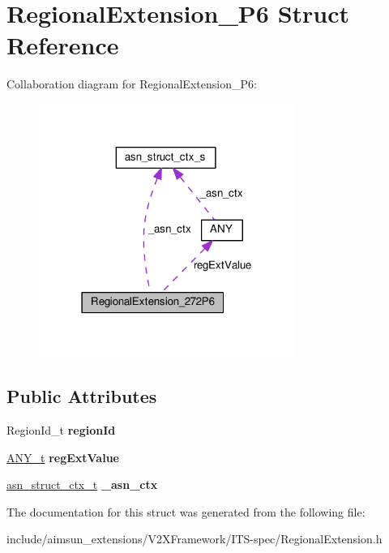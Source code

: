 \hypertarget{structRegionalExtension__272P6}{}\section{Regional\+Extension\+\_\+P6 Struct Reference}
\label{structRegionalExtension__272P6}


Collaboration diagram for Regional\+Extension\+\_\+P6\+:\nopagebreak
\begin{figure}[H]
\begin{center}
\leavevmode
\includegraphics[width=238pt]{structRegionalExtension__272P6__coll__graph}
\end{center}
\end{figure}
\subsection*{Public Attributes}
\begin{DoxyCompactItemize}
\item 
Region\+Id\+\_\+t {\bfseries region\+Id}\hypertarget{structRegionalExtension__272P6_aac2a04ddafd2c1e5e2d0b530818102aa}{}\label{structRegionalExtension__272P6_aac2a04ddafd2c1e5e2d0b530818102aa}

\item 
\hyperlink{structANY}{A\+N\+Y\+\_\+t} {\bfseries reg\+Ext\+Value}\hypertarget{structRegionalExtension__272P6_aa54ce52c2a579fbc235bed6d8b986e7a}{}\label{structRegionalExtension__272P6_aa54ce52c2a579fbc235bed6d8b986e7a}

\item 
\hyperlink{structasn__struct__ctx__s}{asn\+\_\+struct\+\_\+ctx\+\_\+t} {\bfseries \+\_\+asn\+\_\+ctx}\hypertarget{structRegionalExtension__272P6_ac0568c8cd15c8d8fba30943770d6c79a}{}\label{structRegionalExtension__272P6_ac0568c8cd15c8d8fba30943770d6c79a}

\end{DoxyCompactItemize}


The documentation for this struct was generated from the following file\+:\begin{DoxyCompactItemize}
\item 
include/aimsun\+\_\+extensions/\+V2\+X\+Framework/\+I\+T\+S-\/spec/Regional\+Extension.\+h\end{DoxyCompactItemize}
